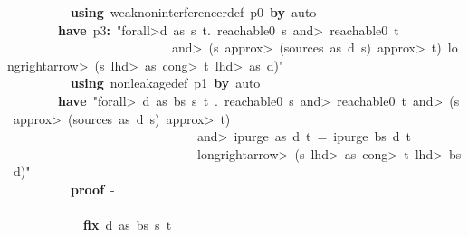 \documentclass{article}
\newcommand{\syntaxKEYWORDA}[1]{\textcolor[rgb]{0.0,0.4,0.6}{\textbf{#1}}}
\newcommand{\syntaxKEYWORDC}[1]{\textcolor[rgb]{0.0,0.6,1.0}{\textbf{#1}}}
\newcommand{\syntaxLITERALA}[1]{\textcolor[rgb]{1.0,0.0,0.8}{#1}}
\newcommand{\syntaxOPERATOR}[1]{\textcolor[rgb]{0.0,0.0,0.0}{\textbf{#1}}}
\newcommand{\syntaxKEYWORDA}[1]{\textcolor[rgb]{0.0,0.4,0.6}{\textbf{#1}}}
\newcommand{\syntaxKEYWORDC}[1]{\textcolor[rgb]{0.0,0.6,1.0}{\textbf{#1}}}
\newcommand{\syntaxLITERALA}[1]{\textcolor[rgb]{1.0,0.0,0.8}{#1}}
\newcommand{\syntaxOPERATOR}[1]{\textcolor[rgb]{0.0,0.0,0.0}{\textbf{#1}}}
\newcommand{\syntaxKEYWORDA}[1]{\textcolor[rgb]{0.0,0.4,0.6}{\textbf{#1}}}
\newcommand{\syntaxKEYWORDC}[1]{\textcolor[rgb]{0.0,0.6,1.0}{\textbf{#1}}}
\newcommand{\syntaxLITERALA}[1]{\textcolor[rgb]{1.0,0.0,0.8}{#1}}
\newcommand{\syntaxOPERATOR}[1]{\textcolor[rgb]{0.0,0.0,0.0}{\textbf{#1}}}
\newcommand{\syntaxKEYWORDA}[1]{\textcolor[rgb]{0.0,0.4,0.6}{#1}}
\newcommand{\syntaxKEYWORDC}[1]{\textcolor[rgb]{0.0,0.6,1.0}{#1}}
\newcommand{\syntaxLITERALA}[1]{\textcolor[rgb]{1.0,0.0,0.8}{\textbf{#1}}}
\newcommand{\syntaxOPERATOR}[1]{\textcolor[rgb]{0.0,0.0,0.0}{#1}}
\newcommand{\syntaxKEYWORDA}[1]{\textcolor[rgb]{0.0,0.4,0.6}{\textbf{#1}}}
\newcommand{\syntaxKEYWORDC}[1]{\textcolor[rgb]{0.0,0.6,1.0}{\textbf{#1}}}
\newcommand{\syntaxLITERALA}[1]{\textcolor[rgb]{1.0,0.0,0.8}{#1}}
\newcommand{\syntaxOPERATOR}[1]{\textcolor[rgb]{0.0,0.0,0.0}{\textbf{#1}}}
\newcommand{\syntaxKEYWORDA}[1]{\textcolor[rgb]{0.0,0.4,0.6}{\textbf{#1}}}
\newcommand{\syntaxKEYWORDC}[1]{\textcolor[rgb]{0.0,0.6,1.0}{\textbf{#1}}}
\newcommand{\syntaxLITERALA}[1]{\textcolor[rgb]{1.0,0.0,0.8}{#1}}
\newcommand{\syntaxOPERATOR}[1]{\textcolor[rgb]{0.0,0.0,0.0}{\textbf{#1}}}
\begin{document}
{\ }{\ }{\ }{\ }{\ }{\ }{\ }{\ }{\ }{\ }\syntaxKEYWORDA{using}{\ }weak\usebox{\underscorebox}noninterference\usebox{\underscorebox}r\usebox{\underscorebox}def{\ }p0{\ }\syntaxKEYWORDA{by}{\ }auto\hspace*{\fill}\\
{\ }{\ }{\ }{\ }{\ }{\ }{\ }{\ }\syntaxKEYWORDA{have}{\ }p3\syntaxOPERATOR{:}{\ }\syntaxLITERALA{"\<forall>d{\ }as{\ }s{\ }t.{\ }reachable0{\ }s{\ }\<and>{\ }reachable0{\ }t}\hspace*{\fill}\\
\syntaxLITERALA{{\ }{\ }{\ }{\ }{\ }{\ }{\ }{\ }{\ }{\ }{\ }{\ }{\ }{\ }{\ }{\ }{\ }{\ }{\ }{\ }{\ }{\ }{\ }{\ }{\ }{\ }\<and>{\ }(s{\ }\<approx>{\ }(sources{\ }as{\ }d{\ }s){\ }\<approx>{\ }t){\ }\<longrightarrow>{\ }(s{\ }\<lhd>{\ }as{\ }\<cong>{\ }t{\ }\<lhd>{\ }as{\ }\usebox{\atbox}{\ }d)"}\hspace*{\fill}\\
{\ }{\ }{\ }{\ }{\ }{\ }{\ }{\ }{\ }{\ }\syntaxKEYWORDA{using}{\ }nonleakage\usebox{\underscorebox}def{\ }p1{\ }\syntaxKEYWORDA{by}{\ }auto\hspace*{\fill}\\
{\ }{\ }{\ }{\ }{\ }{\ }{\ }{\ }\syntaxKEYWORDA{have}{\ }\syntaxLITERALA{"\<forall>{\ }d{\ }as{\ }bs{\ }s{\ }t{\ }.{\ }reachable0{\ }s{\ }\<and>{\ }reachable0{\ }t{\ }\<and>{\ }(s{\ }\<approx>{\ }(sources{\ }as{\ }d{\ }s){\ }\<approx>{\ }t){\ }}\hspace*{\fill}\\
\syntaxLITERALA{{\ }{\ }{\ }{\ }{\ }{\ }{\ }{\ }{\ }{\ }{\ }{\ }{\ }{\ }{\ }{\ }{\ }{\ }{\ }{\ }{\ }{\ }{\ }{\ }{\ }{\ }{\ }{\ }{\ }{\ }\<and>{\ }ipurge{\ }as{\ }d{\ }t{\ }={\ }ipurge{\ }bs{\ }d{\ }t}\hspace*{\fill}\\
\syntaxLITERALA{{\ }{\ }{\ }{\ }{\ }{\ }{\ }{\ }{\ }{\ }{\ }{\ }{\ }{\ }{\ }{\ }{\ }{\ }{\ }{\ }{\ }{\ }{\ }{\ }{\ }{\ }{\ }{\ }{\ }{\ }\<longrightarrow>{\ }(s{\ }\<lhd>{\ }as{\ }\<cong>{\ }t{\ }\<lhd>{\ }bs{\ }\usebox{\atbox}{\ }d)"}\hspace*{\fill}\\
{\ }{\ }{\ }{\ }{\ }{\ }{\ }{\ }{\ }{\ }\syntaxKEYWORDA{proof}{\ }{-}\hspace*{\fill}\\
{\ }{\ }{\ }{\ }{\ }{\ }{\ }{\ }{\ }{\ }\syntaxKEYWORDA{\usebox{\opencurlybracket}}\hspace*{\fill}\\
{\ }{\ }{\ }{\ }{\ }{\ }{\ }{\ }{\ }{\ }{\ }{\ }\syntaxKEYWORDC{fix}{\ }d{\ }as{\ }bs{\ }s{\ }t\hspace*{\fill}\\
\end{document}
